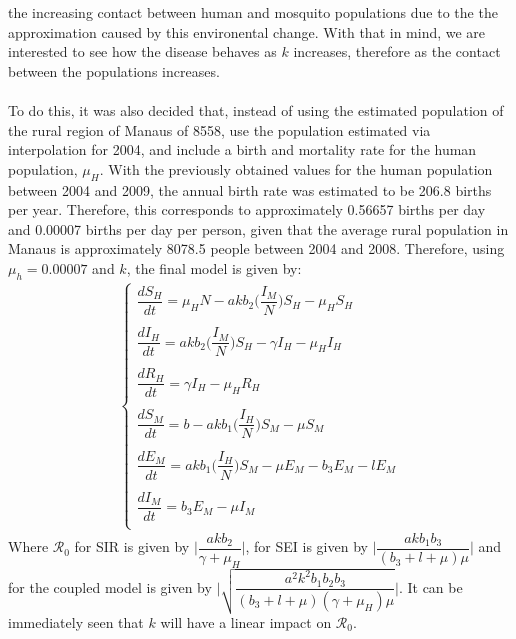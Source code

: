 the increasing contact between human and mosquito populations due to the
the approximation caused by this environental change. With that in mind, 
we are interested to see how the disease behaves as $k$ increases, therefore
as the contact between the populations increases.
\\\\
To do this, it was also decided that, instead of using the estimated population 
of the rural region of Manaus of 8558, use the population estimated via interpolation 
for 2004, and include a birth and mortality rate for the human population, $\mu_H$. 
With the previously obtained values for the human population 
between 2004 and 2009, the annual birth rate was 
estimated to be 206.8 births per year. Therefore, this corresponds 
to approximately 0.56657 births per day and 0.00007 births per day 
per person, given that the average rural population in Manaus is 
approximately 8078.5 people between 2004 and 2008. Therefore, using $\mu_h = 0.00007$ 
and $k$, the final model is given by:
\begin{gather*}
        \begin{cases}
        \dfrac{dS_H}{dt} = \mu_HN-akb_2\bigg(\dfrac{I_M}{N}\bigg)S_H - \mu_HS_H\\
        \\
        \dfrac{dI_H}{dt} = akb_2\bigg(\dfrac{I_M}{N}\bigg)S_H-\gamma I_H - \mu_HI_H\\
        \\
        \dfrac{dR_H}{dt} = \gamma I_H - \mu_HR_H\\
        \\
        \dfrac{dS_M}{dt} = b - akb_1\bigg(\dfrac{I_H}{N}\bigg)S_M - \mu S_M\\
        \\
        \dfrac{dE_M}{dt} = akb_1\bigg(\dfrac{I_H}{N}\bigg)S_M - \mu E_M - b_3E_M -lE_M\\
        \\
        \dfrac{dI_M}{dt} = b_3E_M -\mu I_M\\
        \end{cases}
        \end{gather*}
Where $\mathcal{R}_0$ for SIR is given by $\Big | \dfrac{akb_2}{\gamma + \mu_H}\Big | $,
for SEI is given by $\Big | \dfrac{akb_1b_3}{(b_3 + l + \mu)\mu}\Big | $
and for the coupled model is given by $\Big | \sqrt{\dfrac{a^2k^2b_1b_2b_3}{(b_3+l+\mu)(\gamma+\mu_H)\mu}}\Big | $.
It can be immediately seen that $k$ will have a linear impact on
$\mathcal{R}_0$.
\\\\
